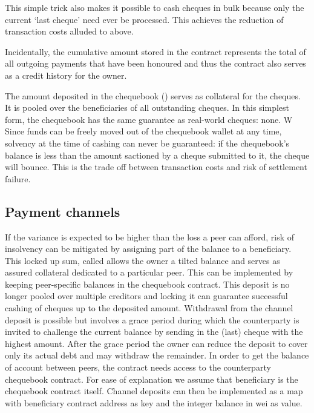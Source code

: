 This simple trick also makes it possible to cash cheques in bulk because only the current `last cheque' need ever be processed. This achieves the reduction of transaction costs alluded to above.

Incidentally, the cumulative amount stored in the contract represents the total of all outgoing payments that have been honoured and thus the contract also serves as a credit history for the owner.

The amount deposited in the chequebook () serves as collateral for the cheques. It is pooled over the beneficiaries of all outstanding cheques.
In this simplest form, the chequebook has the same guarantee as real-world cheques: none. W Since funds can be freely moved out of the chequebook wallet at any time, solvency at the time of cashing can never be guaranteed: if the chequebook's balance is less than the amount sactioned by a cheque submitted to it, the cheque will bounce. This is the trade off between transaction costs and risk of settlement failure.







\subsection{Payment channels}

If the variance is expected to be higher than the loss a peer can afford,
risk of insolvency can be mitigated by assigning part of the balance to a beneficiary.
This locked up sum, called  allows the owner a tilted balance and
serves as assured collateral dedicated to a particular peer.
This can be implemented by keeping peer-specific balances in the chequebook contract.
This deposit is no longer pooled over multiple creditors
and locking it can guarantee successful cashing of cheques up to the deposited amount.
Withdrawal from the channel deposit is possible but involves a grace period during which
the counterparty is invited to challenge the current balance by sending in the (last) cheque
with the highest amount. After the grace period the owner can reduce the deposit to cover only
its actual debt and may withdraw the remainder.
In order to get the balance of account between peers, the contract needs access to the counterparty
chequebook contract. For ease of explanation we assume that beneficiary is the
chequebook contract itself. Channel deposits can then be implemented as a map with beneficiary contract
address as key and the integer balance in wei as value.

